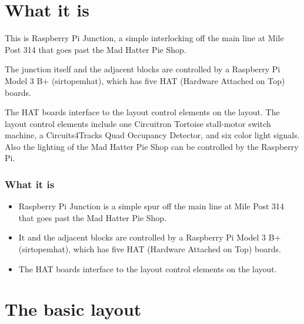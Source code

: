 

\section{What it is}

This is Raspberry Pi Junction, a simple interlocking off the main line at Mile 
Post 314 that goes past the Mad Hatter Pie Shop.

The junction itself and the adjacent blocks are controlled by a Raspberry Pi 
Model 3 B+ (sirtopemhat), which has five HAT (Hardware Attached on Top) boards.

The HAT boards interface to the layout control elements on the layout. The
layout control elements include one Circuitron Tortoise stall-motor switch
machine, a Circuits4Tracks Quad Occupancy Detector, and six color light
signals.  Also the lighting of the Mad Hatter Pie Shop can be controlled by 
the Raspberry Pi.

\begin{frame}
   \frametitle{What it is}
   \begin{itemize}
   \item Raspberry Pi Junction is a simple spur off the main line at Mile Post 
   314 that goes past the Mad Hatter Pie Shop. 
   \item It and the adjacent blocks are controlled by a Raspberry Pi Model 3 
   B+ (sirtopemhat), which has five HAT (Hardware Attached on Top) boards.
   \item The HAT boards interface to the layout control elements on the 
   layout.
   \end{itemize}
\end{frame} 

\section{The basic layout}

